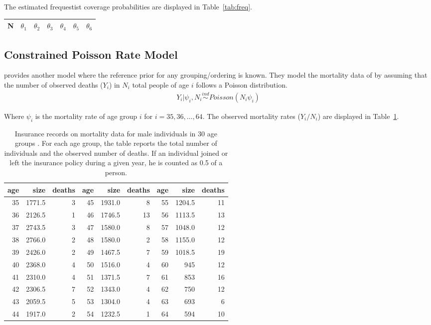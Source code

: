 \documentclass[11pt,a4paper,notitlepage]{article}
\begin{document}
The estimated frequestist coverage probabilities are displayed in 
Table~\ref{tab:freq}.

\begin{tabular}{c|cccccc}
\hline
N & $\theta_1$&$\theta_2$&$\theta_3$&$\theta_4$&$\theta_5$&$\theta_6$\\
\hline
\end{tabular}

\subsection{Constrained Poisson Rate Model}
\cite{SonksenPeruggia2012} provides another model where the reference
prior for any grouping/ordering is known.  They model the mortality data 
of \cite{Broffitt1988} by assuming that the number of observed deaths 
($Y_i$) in $N_i$ total people of age $i$ follows a Poisson distribution. 
\begin{eqnarray}
Y_i | \psi_i, N_i \stackrel{ind}{\sim} Poisson(N_i\psi_i)\label{model:poi}
\end{eqnarray}

Where $\psi_i$ is the mortality rate of age group $i$ for $i = 35,
36, \ldots, 64$.  The observed mortality rates ($Y_i/N_i$) are
displayed in Table~\ref{tab:poi_data}.  

\begin{table}[!tb] 
  \caption{Insurance records on mortality data for male individuals in 
    30 age groups \citep{Broffitt1988}. For each age group, the table 
    reports the total number of individuals and the observed number of 
    deaths. If an individual joined or left the insurance policy during 
    a given year, he is counted as 0.5 of a person.} \label{tab:poi_data}
\begin{center}
\begin{tabular}[c]{|rrr|rrr|rrr|}
\hline
age & size & deaths & age & size & deaths  & age & size & deaths  \\
\hline
35 & 1771.5 & 3 & 45 & 1931.0 & 8 & 55 & 1204.5 & 11     \\
36 & 2126.5 & 1 & 46 & 1746.5 & 13 & 56 & 1113.5 & 13          \\
37 & 2743.5 & 3 & 47 & 1580.0 & 8 & 57 & 1048.0 & 12            \\
38 & 2766.0 & 2 & 48 & 1580.0 & 2  & 58 & 1155.0 & 12         \\
39 & 2426.0 & 2 & 49 & 1467.5 & 7  & 59 & 1018.5 & 19        \\
40 & 2368.0 & 4 & 50 & 1516.0 & 4  & 60 & 945 & 12         \\
41 & 2310.0 & 4 & 51 & 1371.5 & 7 & 61 & 853 & 16    \\
42 & 2306.5 & 7 & 52 & 1343.0 & 4 & 62 & 750 & 12      \\
43 & 2059.5 & 5 & 53 & 1304.0 & 4  & 63 & 693 & 6   \\
44 & 1917.0 & 2 & 54 & 1232.5 & 1 & 64 & 594 & 10     \\
\hline 
\end{tabular}
\end{center}
\end{table}
\end{document}
